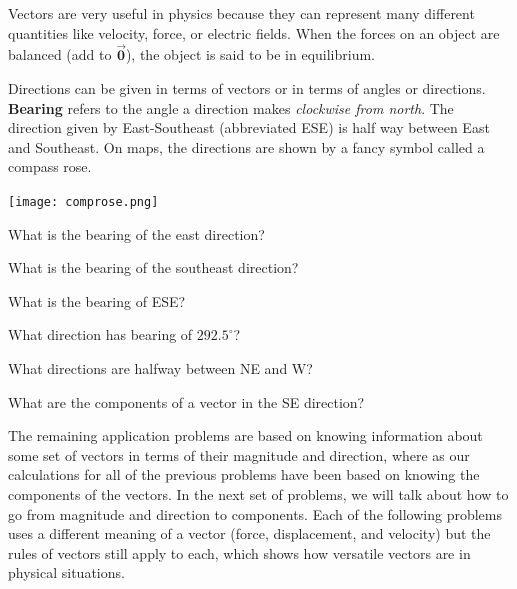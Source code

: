 \begin{info} Vectors are very useful in physics because they can represent many different quantities like velocity, force, or electric fields. When the forces on an object are balanced (add to $\vec{\textbf{0}}$), the object is said to be in equilibrium.

Directions can be given in terms of vectors or in terms of angles or directions. \textbf{Bearing} refers to the angle a direction makes \emph{clockwise from north}. The direction given by East-Southeast (abbreviated ESE) is half way between East and Southeast. On maps, the directions are shown by a fancy symbol called a compass rose.

\begin{center} \texttt{[image: comprose.png]} \end{center}
\end{info}

\bq \be
\item What is the bearing of the east direction?
\item What is the bearing of the southeast direction?
\item What is the bearing of ESE?
\item What direction has bearing of $292.5^\circ$?
\item What directions are halfway between NE and W?
\item What are the components of a vector in the SE direction?
\ee \eq

The remaining application problems are based on knowing information about some set of vectors in terms of their magnitude and direction, where as our calculations for all of the previous problems have been based on knowing the components of the vectors. In the next set of problems, we will talk about how to go from magnitude and direction to components. Each of the following problems uses a different meaning of a vector (force, displacement, and velocity) but the rules of vectors still apply to each, which shows how versatile vectors are in physical situations.

